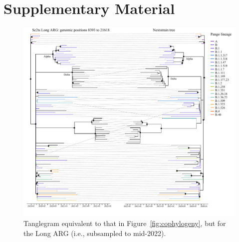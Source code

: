 \documentclass{article}
\begin{document}
% 



\clearpage
\renewcommand\thefigure{S\arabic{figure}}
\renewcommand{\theHfigure}{S\arabic{figure}}
\setcounter{figure}{0}
\renewcommand\thetable{S\arabic{table}}
\renewcommand\theHtable{S\arabic{table}}
\setcounter{table}{0}
\section*{Supplementary Material}

\begin{figure}[h] \centering
\includegraphics[width=\textwidth]{figures/supp_cophylogeny_long.pdf}
\caption{\label{fig:cophylogeny_long}Tanglegram equivalent to that in Figure~\ref{fig:cophylogeny},
but for the Long ARG (i.e., subsampled to mid-2022).}
\end{figure}
\end{document}
